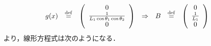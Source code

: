 \begin{frame}[t]
\begin{equation*}
\begin{array}{lclclcl}
  g(x) &\stackrel{\rm def}{=}&
  \left(
   \begin{array}{c}
    0 \\
    \frac{1}{L_1 \cos \theta_1 \cos \theta_2} \\
    0
   \end{array}
  \right) &\Rightarrow&
  B &\stackrel{\rm def}{=}&
  \left(
   \begin{array}{c}
    0 \\
    \frac{1}{L_1} \\
    0
   \end{array}
 \right)
 \end{array}
\end{equation*}
      より，線形方程式は次のようになる．
\end{frame}

